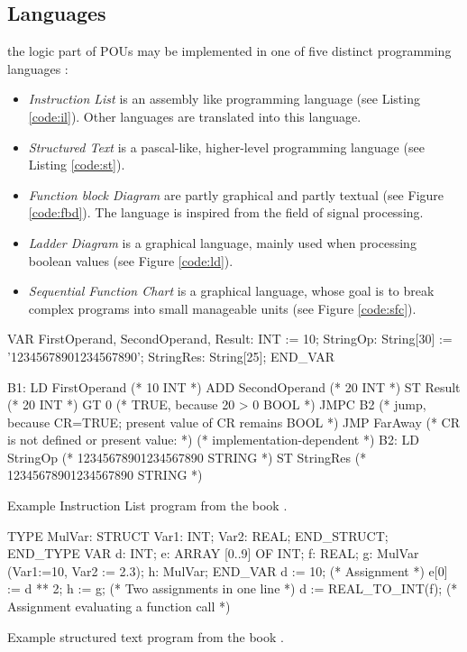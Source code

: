 \subsection{Languages}
\label{sub:iec-lang}
the logic part of POUs may be implemented in one of five distinct programming languages \cite{johnIEC611313Programming2010}:
\begin{itemize}
	\item \emph{Instruction List} is an assembly like programming language (see Listing \ref{code:il}). Other languages are translated into this language.
	\item \emph{Structured Text} is a pascal-like, higher-level programming language (see Listing \ref{code:st}).
	\item \emph{Function block Diagram} are partly graphical and partly textual (see Figure \ref{code:fbd}). The language is inspired from the field of signal processing. 
	\item \emph{Ladder Diagram} is a graphical language, mainly used when processing boolean values (see Figure \ref{code:ld}).
	\item \emph{Sequential Function Chart} is a graphical language, whose goal is to break complex programs into small manageable units (see Figure \ref{code:sfc}). 
\end{itemize}


\begin{program}
	\begin{GenericCode}
		VAR
		FirstOperand, SecondOperand, Result: INT := 10;
		StringOp: String[30] := '12345678901234567890';
		StringRes: String[25];
		END_VAR
		
		B1:	LD FirstOperand (* 10 {INT} *)
		ADD SecondOperand (* 20 {INT} *)
		ST Result (* 20 {INT} *)
		GT 0 (* TRUE, because 20 > 0 {BOOL} *)
		JMPC B2
		(* jump, because CR=TRUE; present value of CR remains {BOOL} *)
		JMP FarAway (* CR is not defined or present value: *)
		(* implementation-dependent *)
		B2: LD StringOp (* 12345678901234567890 {STRING} *)
		ST StringRes (* 12345678901234567890 {STRING} *)\end{GenericCode}
	\caption{Example Instruction List program from the book \cite{johnIEC611313Programming2010}.}
	\label{code:il}
\end{program}

\begin{program}
	\begin{GenericCode}
		TYPE MulVar: STRUCT Var1: INT; Var2: REAL; END_STRUCT; END_TYPE
		VAR d: INT;
		e: ARRAY [0..9] OF INT; 
		f: REAL;
		g: MulVar (Var1:=10, Var2 := 2.3); 
		h: MulVar;
		END_VAR
		d := 10; (* Assignment *)
		e[0] := d ** 2;   h  := g; (* Two assignments in one line *)
		d := REAL_TO_INT(f); (* Assignment evaluating a function call *)\end{GenericCode}
	\caption{Example structured text program from the book \cite{johnIEC611313Programming2010}.}
	\label{code:st}
\end{program}

